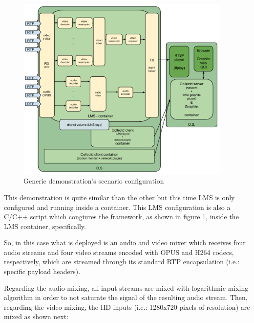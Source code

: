 \begin{figure}[htb]
\begin{center}
\includegraphics[width=0.95\textwidth]{./images/genericScenario.png}
\caption{Generic demonstration's scenario configuration}
\label{F:gdsc}
\end{center}
\end{figure}

This demonstration is quite similar than the other but this time LMS is only configured and running inside a container. This LMS configuration is also a C/C++ script which congiures the framework, as shown in figure \ref{F:gdsc}, inside the LMS container, specifically.

So, in this case what is deployed is an audio and video mixer which receives four audio streams and four video streams encoded with OPUS and H264 codecs, respectively, which are streamed through its standard RTP encapsulation (i.e.: specific payload headers).

Regarding the audio mixing, all input streams are mixed with logarithmic mixing algorithm in order to not saturate the signal of the resulting audio stream. Then, regarding the video mixing, the HD inputs (i.e.: 1280x720 pixels of resolution) are mixed as shown next:

